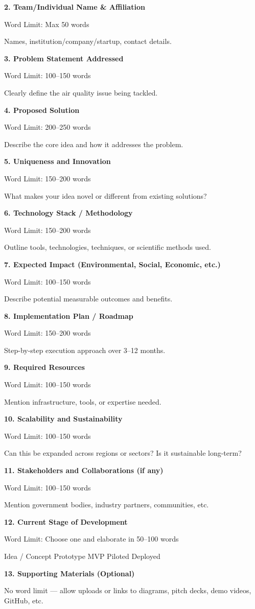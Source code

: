\documentclass[
]{article}
\begin{document}
\textbf{2. Team/Individual Name \& Affiliation}

Word Limit: Max 50 words

Names, institution/company/startup, contact details.

\textbf{3. Problem Statement Addressed}

Word Limit: 100--150 words

Clearly define the air quality issue being tackled.

\textbf{4. Proposed Solution}

Word Limit: 200--250 words

Describe the core idea and how it addresses the problem.

\textbf{5. Uniqueness and Innovation}

Word Limit: 150--200 words

What makes your idea novel or different from existing solutions?

\textbf{6. Technology Stack / Methodology}

Word Limit: 150--200 words

Outline tools, technologies, techniques, or scientific methods used.

\textbf{7. Expected Impact (Environmental, Social, Economic, etc.)}

Word Limit: 100--150 words

Describe potential measurable outcomes and benefits.

\textbf{8. Implementation Plan / Roadmap}

Word Limit: 150--200 words

Step-by-step execution approach over 3--12 months.

\textbf{9. Required Resources}

Word Limit: 100--150 words

Mention infrastructure, tools, or expertise needed.

\textbf{10. Scalability and Sustainability}

Word Limit: 100--150 words

Can this be expanded across regions or sectors? Is it sustainable
long-term?

\textbf{11. Stakeholders and Collaborations (if any)}

Word Limit: 100--150 words

Mention government bodies, industry partners, communities, etc.

\textbf{12. Current Stage of Development}

Word Limit: Choose one and elaborate in 50--100 words

Idea / Concept \textbar{} Prototype \textbar{} MVP \textbar{} Piloted
\textbar{} Deployed

\textbf{13. Supporting Materials (Optional)}

No word limit --- allow uploads or links to diagrams, pitch decks, demo
videos, GitHub, etc.
\end{document}
